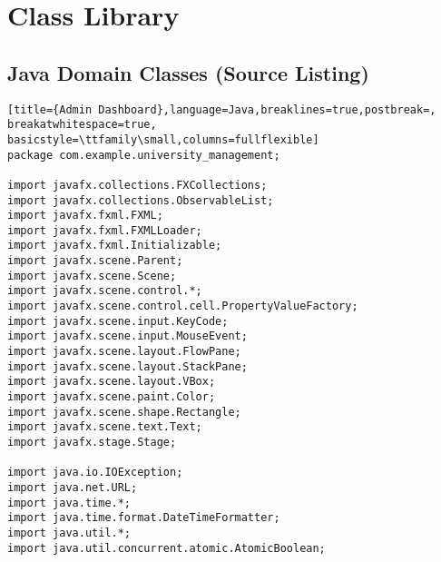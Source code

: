 \newpage
\section{Class Library}  


\subsection*{Java Domain Classes (Source Listing)} 

\begin{comment}
    Place each class from the class library for verification purposes in the user guide
\end{comment}



\begin{lstlisting}[title={Admin Dashboard},language=Java,breaklines=true,postbreak=, breakatwhitespace=true, basicstyle=\ttfamily\small,columns=fullflexible]
package com.example.university_management;

import javafx.collections.FXCollections;
import javafx.collections.ObservableList;
import javafx.fxml.FXML;
import javafx.fxml.FXMLLoader;
import javafx.fxml.Initializable;
import javafx.scene.Parent;
import javafx.scene.Scene;
import javafx.scene.control.*;
import javafx.scene.control.cell.PropertyValueFactory;
import javafx.scene.input.KeyCode;
import javafx.scene.input.MouseEvent;
import javafx.scene.layout.FlowPane;
import javafx.scene.layout.StackPane;
import javafx.scene.layout.VBox;
import javafx.scene.paint.Color;
import javafx.scene.shape.Rectangle;
import javafx.scene.text.Text;
import javafx.stage.Stage;

import java.io.IOException;
import java.net.URL;
import java.time.*;
import java.time.format.DateTimeFormatter;
import java.util.*;
import java.util.concurrent.atomic.AtomicBoolean;


\end{lstlisting}
